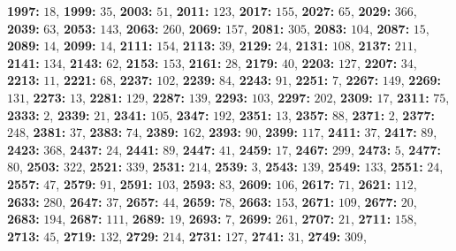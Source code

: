 \textsf{\bfseries 1997:} $18$, \textsf{\bfseries 1999:} $35$, \textsf{\bfseries 2003:} $51$, \textsf{\bfseries 2011:} $123$, \textsf{\bfseries 2017:} $155$, \textsf{\bfseries 2027:} $65$, \textsf{\bfseries 2029:} $366$, \textsf{\bfseries 2039:} $63$, \textsf{\bfseries 2053:} $143$, \textsf{\bfseries 2063:} $260$, \textsf{\bfseries 2069:} $157$, \textsf{\bfseries 2081:} $305$, \textsf{\bfseries 2083:} $104$, \textsf{\bfseries 2087:} $15$, \textsf{\bfseries 2089:} $14$, \textsf{\bfseries 2099:} $14$, \textsf{\bfseries 2111:} $154$, \textsf{\bfseries 2113:} $39$, \textsf{\bfseries 2129:} $24$, \textsf{\bfseries 2131:} $108$, \textsf{\bfseries 2137:} $211$, \textsf{\bfseries 2141:} $134$, \textsf{\bfseries 2143:} $62$, \textsf{\bfseries 2153:} $153$, \textsf{\bfseries 2161:} $28$, \textsf{\bfseries 2179:} $40$, \textsf{\bfseries 2203:} $127$, \textsf{\bfseries 2207:} $34$, \textsf{\bfseries 2213:} $11$, \textsf{\bfseries 2221:} $68$, \textsf{\bfseries 2237:} $102$, \textsf{\bfseries 2239:} $84$, \textsf{\bfseries 2243:} $91$, \textsf{\bfseries 2251:} $7$, \textsf{\bfseries 2267:} $149$, \textsf{\bfseries 2269:} $131$, \textsf{\bfseries 2273:} $13$, \textsf{\bfseries 2281:} $129$, \textsf{\bfseries 2287:} $139$, \textsf{\bfseries 2293:} $103$, \textsf{\bfseries 2297:} $202$, \textsf{\bfseries 2309:} $17$, \textsf{\bfseries 2311:} $75$, \textsf{\bfseries 2333:} $2$, \textsf{\bfseries 2339:} $21$, \textsf{\bfseries 2341:} $105$, \textsf{\bfseries 2347:} $192$, \textsf{\bfseries 2351:} $13$, \textsf{\bfseries 2357:} $88$, \textsf{\bfseries 2371:} $2$, \textsf{\bfseries 2377:} $248$, \textsf{\bfseries 2381:} $37$, \textsf{\bfseries 2383:} $74$, \textsf{\bfseries 2389:} $162$, \textsf{\bfseries 2393:} $90$, \textsf{\bfseries 2399:} $117$, \textsf{\bfseries 2411:} $37$, \textsf{\bfseries 2417:} $89$, \textsf{\bfseries 2423:} $368$, \textsf{\bfseries 2437:} $24$, \textsf{\bfseries 2441:} $89$, \textsf{\bfseries 2447:} $41$, \textsf{\bfseries 2459:} $17$, \textsf{\bfseries 2467:} $299$, \textsf{\bfseries 2473:} $5$, \textsf{\bfseries 2477:} $80$, \textsf{\bfseries 2503:} $322$, \textsf{\bfseries 2521:} $339$, \textsf{\bfseries 2531:} $214$, \textsf{\bfseries 2539:} $3$, \textsf{\bfseries 2543:} $139$, \textsf{\bfseries 2549:} $133$, \textsf{\bfseries 2551:} $24$, \textsf{\bfseries 2557:} $47$, \textsf{\bfseries 2579:} $91$, \textsf{\bfseries 2591:} $103$, \textsf{\bfseries 2593:} $83$, \textsf{\bfseries 2609:} $106$, \textsf{\bfseries 2617:} $71$, \textsf{\bfseries 2621:} $112$, \textsf{\bfseries 2633:} $280$, \textsf{\bfseries 2647:} $37$, \textsf{\bfseries 2657:} $44$, \textsf{\bfseries 2659:} $78$, \textsf{\bfseries 2663:} $153$, \textsf{\bfseries 2671:} $109$, \textsf{\bfseries 2677:} $20$, \textsf{\bfseries 2683:} $194$, \textsf{\bfseries 2687:} $111$, \textsf{\bfseries 2689:} $19$, \textsf{\bfseries 2693:} $7$, \textsf{\bfseries 2699:} $261$, \textsf{\bfseries 2707:} $21$, \textsf{\bfseries 2711:} $158$, \textsf{\bfseries 2713:} $45$, \textsf{\bfseries 2719:} $132$, \textsf{\bfseries 2729:} $214$, \textsf{\bfseries 2731:} $127$, \textsf{\bfseries 2741:} $31$, \textsf{\bfseries 2749:} $309$, 
